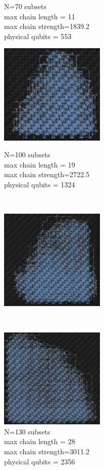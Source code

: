\documentclass[oneside,a4paper]{article}
\begin{document}
\begin{figure}[htp]
\begin{minipage}[b]{4.5cm}
\caption{N=70 subsets\\max chain length = 11\\max chain strength=1839.2\\physical qubits = 553}
\end{minipage}
\end{figure}
\begin{figure}[htp]
\begin{minipage}[b]{4.5cm}
\includegraphics[width=5cm]{LaTeXTemplate/Images/AdvantageN100.png}
\caption{N=100 subsets\\max chain length = 19\\max chain strength=2722.5\\physical qubits = 1324}
\end{minipage}
\ \hspace{2mm} \hspace{2mm} \
\begin{minipage}[b]{4.5cm}
\centering
\includegraphics[width=5cm]{LaTeXTemplate/Images/AdvantageN130.png}
\caption{N=130 subsets\\max chain length = 28\\max chain strength=3011.2\\physical qubits = 2356}
\end{minipage}
\ \hspace{2mm} \hspace{2mm} \
\begin{minipage}[b]{4.5cm}
\centering
\includegraphics[width=5cm]{LaTeXTemplate/Images/AdvantageN150.png}

\end{minipage}
\end{figure}
\end{document}
